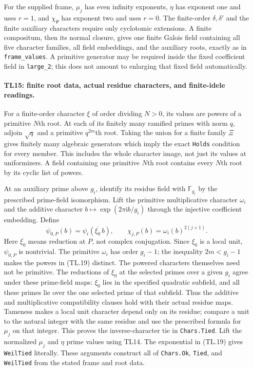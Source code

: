 For the supplied frame, $\mu_j$ has even infinity exponents,
$\eta$ has exponent one and uses $r=1$, and $\chi_\Psi$ has
exponent two and uses $r=0$. The finite-order $\delta,\delta'$
and the finite auxiliary characters require only cyclotomic
extensions. A finite compositum, then its normal closure, gives
one finite Galois field containing all five character families,
all field embeddings, and the auxiliary roots, exactly as in
\texttt{frame\_values}. A primitive generator may be required
inside the fixed coefficient field in \texttt{large\_2}; this
does not amount to enlarging that fixed field automatically.

\paragraph{TL15: finite root data, actual residue characters, and
finite-idele readings.}
For a finite-order character $\xi$ of order dividing $N>0$, its
values are powers of a primitive $N$th root. At each of its
finitely many ramified primes with norm $q$, adjoin
$\sqrt q$ and a primitive $q^{2m}$th root. Taking the union for
a finite family $\Xi$ gives finitely many algebraic generators
which imply the exact \texttt{Holds} condition for every member.
This includes the whole character image, not just its values at
uniformizers. A field containing one primitive $N$th root
contains every $N$th root by its cyclic list of powers.

At an auxiliary prime above $g_i$, identify its residue field
with $\mathbb F_{g_i}$ by the prescribed prime-field isomorphism.
Lift the primitive multiplicative character $\omega_i$ and the
additive character $b\mapsto\exp(2\pi\mathrm i b/g_i)$ through
the injective coefficient embedding. Define
\[
 \psi_{0,P}(b)=\psi_i(\overline{\xi_0}\,b),\qquad
 \chi_{j,P}(b)=\omega_i(b)^{2(j+1)}.               \tag{TL.19}
\]
Here $\overline{\xi_0}$ means reduction at $P$, not complex
conjugation. Since $\xi_0$ is a local unit, $\psi_{0,P}$ is
nontrivial. The primitive $\omega_i$ has order $g_i-1$; the
inequality $2m<g_i-1$ makes the powers in (TL.19) distinct.
The powered characters themselves need not be primitive.
The reductions of $\xi_0$ at the selected primes over a given
$g_i$ agree under these prime-field maps: $\xi_0$ lies in the
specified quadratic subfield, and all these primes lie over
the one selected prime of that subfield. Thus the additive and
multiplicative compatibility clauses hold with their actual
residue maps. Tameness makes a local unit character depend only
on its residue; compare a unit to the natural integer with the
same residue and use the prescribed formula for $\mu_j$ on that
integer. This proves the inverse-character tie in
\texttt{Chars.Tied}. Lift the normalized $\mu_j$ and $\eta$
prime values using TL14. The exponential in (TL.19) gives
\texttt{WeilTied} literally. These arguments construct all of
\texttt{Chars.Ok}, \texttt{Tied}, and \texttt{WeilTied} from the
stated frame and root data.


